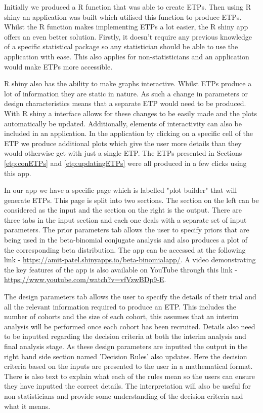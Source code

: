 Initially we produced a R function that was able to create ETPs. Then using R shiny an application was built which utilised this function to produce ETPs. Whilst the R function makes implementing ETPs a lot easier, the R shiny app offers an even better solution. Firstly, it doesn't require any previous knowledge of a specific statistical package so any statistician should be able to use the application with ease. This also applies for non-statisticians and an application would make ETPs more accessible.  

R shiny also has the ability to make graphs interactive. Whilst ETPs produce a lot of information they are static in nature. As such a change in parameters or design characteristics means that a separate ETP would need to be produced. With R shiny a interface allows for these changes to be easily made and the plots automatically be updated. Additionally, elements of interactivity can also be included in an application. In the application by clicking on a specific cell of the ETP we produce additional plots which give the user more details than they would otherwise get with just a single ETP. The ETPs presented in Sections \ref{etp:conETPs} and \ref{etp:updatingETPs} were all produced in a few clicks using this app. 

In our app we have a specific page which is labelled "plot builder" that will generate ETPs. This page is split into two sections. The section on the left can be considered as the input and the section on the right is the output. There are three tabs in the input section and each one deals with a separate set of input parameters. The prior parameters tab allows the user to specify priors that are being used in the beta-binomial conjugate analysis and also produces a plot of the corresponding beta distribution. The app can be accessed at the following link - \href{ https://amit-patel.shinyapps.io/beta-binomialapp/}{https://amit-patel.shinyapps.io/beta-binomialapp/}. A video demonstrating the key features of the app is also available on YouTube through this link - \href{ https://www.youtube.com/watch?v=vfVzwBDp9-E}{https://www.youtube.com/watch?v=vfVzwBDp9-E}.

The design parameters tab allows the user to specify the details of their trial and all the relevant information required to produce an ETP. This includes the number of cohorts and the size of each cohort, this assumes that an interim analysis will be performed once each cohort has been recruited. Details also need to be inputted regarding the decision criteria at both the interim analysis and final analysis stage. As these design parameters are inputted the output in the right hand side section named 'Decision Rules' also updates. Here the decision criteria based on the inputs are presented to the user in a mathematical format. There is also text to explain what each of the rules mean so the users can ensure they have inputted the correct details. The interpretation will also be useful for non statisticians and provide some understanding of the decision criteria and what it means.  

